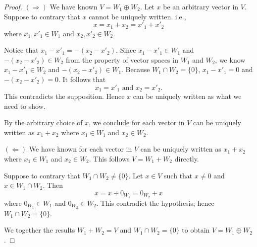 \begin{Exercise}
\begin{proof}
$(\Longrightarrow)$
We have known $V = W_1\oplus W_2$. Let $x$ be an arbitrary vector in $V$. Suppose to contrary that $x$ cannot be uniquely written. i.e.,
$$
x = x_1+x_2 = x'_1+x'_2
$$
where $x_1, x'_1\in W_1$ and $x_2, x'_2\in W_2$.

Notice that $x_1-x'_1 = -(x_2-x'_2)$. Since $x_1-x'_1\in W_1$ and $-(x_2-x'_2)\in W_2$ from the property of vector spaces in $W_1$ and $W_2$, we know $x_1-x'_1\in W_2$ and $-(x_2-x'_2)\in W_1$. Because $W_1\cap W_2 = \{0\}$, $x_1-x'_1=0$ and $-(x_2-x'_2)=0$. It follows that
$$
x_1 = x'_1\text{ and } x_2 = x'_2.
$$
This contradicts the supposition. Hence $x$ can be uniquely written as what we need to show.

By the arbitrary choice of $x$, we conclude for each vector in $V$ can be uniquely written as $x_1+x_2$ where $x_1\in W_1$ and $x_2\in W_2$.

\vspace{2ex}

$(\Longleftarrow)$
We have known for each vector in $V$ can be uniquely written as $x_1+x_2$ where $x_1\in W_1$ and $x_2\in W_2$. This follows $V = W_1+W_2$ directly.

Suppose to contrary that $W_1\cap W_2\neq \{0\}$. Let $x\in V$ such that $x\neq 0$ and $x\in W_1\cap W_2$. Then
$$
x = x + 0_{W_1} = 0_{W_2} + x
$$
where $0_{W_1}\in W_1$ and $0_{W_2}\in W_2$. This contradict the hypothesis; hence $W_1\cap W_2= \{0\}$.

We together the results $W_1+W_2=V$ and $W_1\cap W_2=\{0\}$ to obtain $V=W_1\oplus W_2$.
\end{proof}
\end{Exercise}
